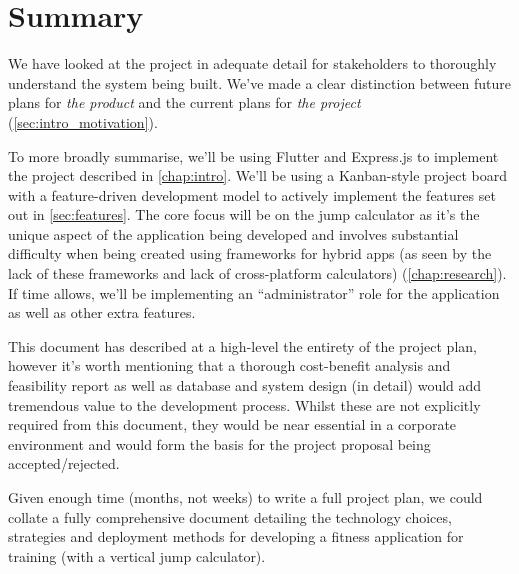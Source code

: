 \chapter{Summary}
We have looked at the project in adequate detail for stakeholders
to thoroughly understand the system being built. We've made a clear distinction between
future plans for \textit{the product} and the current plans for \textit{the project} (\cref{sec:intro_motivation}).
\par
To more broadly summarise, we'll be using Flutter and Express.js to 
implement the project described in \cref{chap:intro}. We'll
be using a Kanban-style project board with a feature-driven development model
to actively implement the features set out in \cref{sec:features}. The core focus
will be on the jump calculator as it's the unique aspect of the application being developed
and involves substantial difficulty when being created using frameworks for hybrid apps (as seen
by the lack of these frameworks and lack of cross-platform calculators) (\cref{chap:research}).
If time allows, we'll be implementing an ``administrator'' role for the application
as well as other extra features.
\par
This document has described at a high-level the entirety of the project plan,
however it's worth mentioning that a thorough cost-benefit analysis
and feasibility report as well as database and system design (in detail)
would add tremendous value to the development process. Whilst these are not 
explicitly required from this document, they would be near essential in a corporate environment
and would form the basis for the project proposal being accepted/rejected.
\par 
Given enough time (months, not weeks) to write a full project plan, we could collate a
fully comprehensive document detailing the technology choices, strategies and deployment methods
for developing a fitness application for training (with a vertical jump calculator).